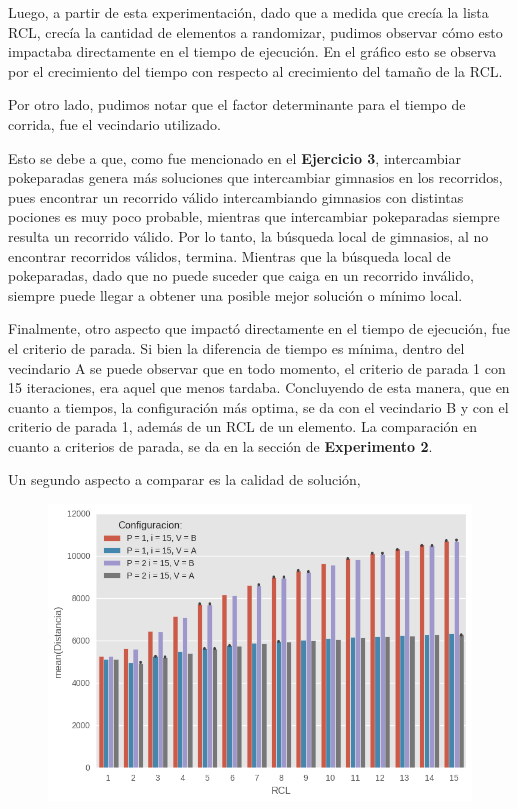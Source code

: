  Luego, a partir de esta experimentación, dado que a medida que crecía la lista RCL, crecía la cantidad de elementos a randomizar, pudimos observar cómo esto impactaba directamente en el tiempo de ejecución. En el gráfico esto se observa por el crecimiento del tiempo con respecto al crecimiento del tamaño de la RCL. \par Por otro lado, pudimos notar que el factor determinante para el tiempo de corrida, fue el vecindario utilizado. 
  \par Esto se debe a que, como fue mencionado en el \textbf{Ejercicio 3}, intercambiar pokeparadas genera más soluciones que intercambiar gimnasios en los recorridos, pues encontrar un recorrido válido intercambiando gimnasios con distintas pociones es muy poco probable, mientras que intercambiar pokeparadas siempre resulta un recorrido válido. Por lo tanto, la búsqueda local de gimnasios, al no encontrar recorridos válidos, termina. Mientras que la búsqueda local de pokeparadas, dado que no puede suceder que caiga en un recorrido inválido, siempre puede llegar a obtener una posible mejor solución o mínimo local. 
  \par Finalmente, otro aspecto que impactó directamente en el tiempo de ejecución, fue el criterio de parada. Si bien la diferencia de tiempo es mínima, dentro del vecindario A se puede observar que en todo momento, el criterio de parada 1 con 15 iteraciones, era aquel que menos tardaba. Concluyendo de esta manera, que en cuanto a tiempos, la configuración más optima, se da con el vecindario B y con el criterio de parada 1, además de un RCL de un elemento. La comparación en cuanto a criterios de parada, se da en la sección de \textbf{Experimento 2}.

  \par Un segundo aspecto a comparar es la calidad de solución,

\begin{figure}[H]
    \begin{center}
      \includegraphics[width=0.7\columnwidth]{imagenes/Ej4/ej4_exp1_Distancia.png}
    \end{center}
\end{figure}


